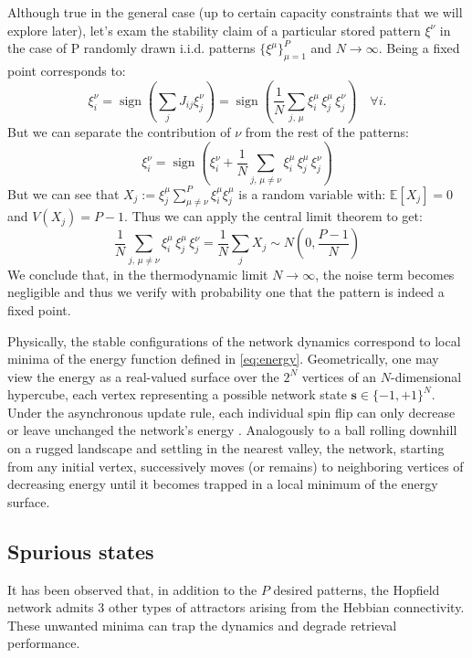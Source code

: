 \documentclass[a4paper,12pt]{report}
\begin{document}
Although true in the general case (up to certain capacity constraints that we will explore
later), let's exam the stability claim of a particular stored pattern $\xi^\nu$ in the case of 
P randomly drawn i.i.d. patterns $\{\xi^{\mu}\}_{\mu=1}^P$ and $N \to \infty$. 
Being a fixed point corresponds to:
\begin{equation}
  \xi^\nu_i = \operatorname{sign}\left( \sum_{j}J_{ij}\xi^\nu_j \right) = 
  \operatorname{sign}\left( \frac{1}{N} \sum_{j,\, \mu} \xi_i^{\mu}\,\xi_j^{\mu}\,\xi^\nu_j \right)
   \quad \forall i.
\end{equation}
But we can separate the contribution of $\nu$ from the rest of the patterns:
\begin{equation}
  \xi^\nu_i = \operatorname{sign}\left(\xi_i^{\nu} + 
  \frac{1}{N} \sum_{j, \,\mu\neq\nu} \xi_i^{\mu}\,\xi_j^{\mu}\, \xi^\nu_j \right)
\end{equation}
But we can see that $X_j := \xi^\mu_j\sum_{\mu\neq\nu}^{P}\xi^\mu_i \xi^\mu_j$ is a random
variable with: $\mathbb{E}[X_j] = 0$ and $V(X_j) = {P-1}$. Thus we can apply the
central limit theorem to get:
\begin{equation}
\frac{1}{N} \sum_{j, \,\mu\neq\nu} \xi_i^{\mu}\,\xi_j^{\mu}\, \xi^\nu_j = 
\frac{1}{N} \sum_{j}X_j \sim N\left(0, \frac{P-1}{N}\right)
\end{equation}
We conclude that, in the thermodynamic limit $N \to \infty$, the noise term becomes 
negligible and thus we verify with probability one that the pattern is indeed a fixed point.
\vspace{0.5em}

Physically, the stable configurations of the network dynamics correspond to local minima 
of the energy function defined in \eqref{eq:energy}.  Geometrically, one may view the 
energy as a real-valued surface over the \(2^N\) vertices of an \(N\)-dimensional 
hypercube, each vertex representing a possible network state 
\(\mathbf{s}\in\{-1,+1\}^N\).  Under the asynchronous update rule, each individual spin 
flip can only decrease or leave unchanged the network's energy \cite{Hertz2018}.  
Analogously to a ball rolling downhill on a rugged landscape and settling in the nearest 
valley, the network, starting from any initial vertex, successively moves (or remains) 
to neighboring vertices of decreasing energy until it becomes trapped in a local minimum 
of the energy surface. 
\vspace*{0.5em}

\subsection*{Spurious states}
It has been observed that, in addition to the $P$ desired patterns, the Hopfield network
admits 3 other types of attractors arising from the Hebbian connectivity.  
These unwanted minima can trap the dynamics and degrade retrieval performance.
\end{document}
